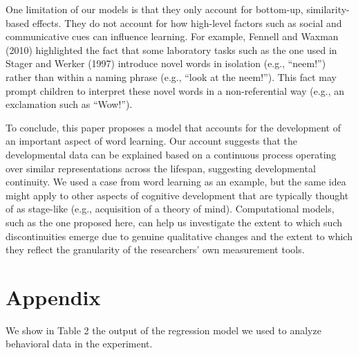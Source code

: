 \documentclass[english,,man,floatsintext]{apa6}
\theoremstyle{definition}
\theoremstyle{definition}
\theoremstyle{definition}
\theoremstyle{remark}
\begin{document}
One limitation of our models is that they only account for bottom-up,
similarity-based effects. They do not account for how high-level factors
such as social and communicative cues can influence learning. For
example, Fennell and Waxman (2010) highlighted the fact that some
laboratory tasks such as the one used in Stager and Werker (1997)
introduce novel words in isolation (e.g., \enquote{neem!}) rather than
within a naming phrase (e.g., \enquote{look at the neem!}). This fact
may prompt children to interpret these novel words in a non-referential
way (e.g., an exclamation such as \enquote{Wow!}).

To conclude, this paper proposes a model that accounts for the
development of an important aspect of word learning. Our account
suggests that the developmental data can be explained based on a
continuous process operating over similar representations across the
lifespan, suggesting developmental continuity. We used a case from word
learning as an example, but the same idea might apply to other aspects
of cognitive development that are typically thought of as stage-like
(e.g., acquisition of a theory of mind). Computational models, such as
the one proposed here, can help us investigate the extent to which such
discontinuities emerge due to genuine qualitative changes and the extent
to which they reflect the granularity of the researchers' own
measurement tools.

\vspace{1em}

\vspace{1em}

\section{Appendix}\label{appendix}

We show in Table 2 the output of the regression model we used to analyze
behavioral data in the experiment.
\end{document}
